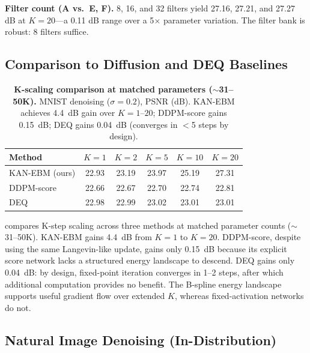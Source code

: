 \documentclass{article}
\begin{document}
\textbf{Filter count (A vs.\ E, F).} 8, 16, and 32 filters yield 27.16, 27.21, and
27.27 dB at $K{=}20$—a 0.11 dB range over a 5$\times$ parameter variation. The
filter bank is robust: 8 filters suffice.

\subsection{Comparison to Diffusion and DEQ Baselines}
\label{sec:diffusion_compare}

\begin{table}[ht]
\centering
\caption{%
  \textbf{K-scaling comparison at matched parameters ($\sim$31--50K).}
  MNIST denoising ($\sigma{=}0.2$), PSNR (dB).
  KAN-EBM achieves 4.4~dB gain over $K{=}1$--$20$; DDPM-score gains 0.15~dB;
  DEQ gains 0.04~dB (converges in $<$5 steps by design).
}
\label{tab:comparison}
\begin{tabular}{lccccc}
\toprule
Method & $K{=}1$ & $K{=}2$ & $K{=}5$ & $K{=}10$ & $K{=}20$ \\
\midrule
KAN-EBM (ours) & 22.93 & 23.19 & 23.97 & 25.19 & 27.31 \\
DDPM-score     & 22.66 & 22.67 & 22.70 & 22.74 & 22.81 \\
DEQ            & 22.98 & 22.99 & 23.02 & 23.01 & 23.01 \\
\bottomrule
\end{tabular}
\end{table}

 compares K-step scaling across three methods at matched
parameter counts ($\sim$31--50K). KAN-EBM gains 4.4~dB from $K{=}1$ to $K{=}20$.
DDPM-score, despite using the same Langevin-like update, gains only 0.15~dB because
its explicit score network lacks a structured energy landscape to descend. DEQ gains
only 0.04~dB: by design, fixed-point iteration converges in 1--2 steps, after which
additional computation provides no benefit. The B-spline energy landscape supports useful gradient flow over extended $K$,
whereas fixed-activation networks do not.

\subsection{Natural Image Denoising (In-Distribution)}
\end{document}

